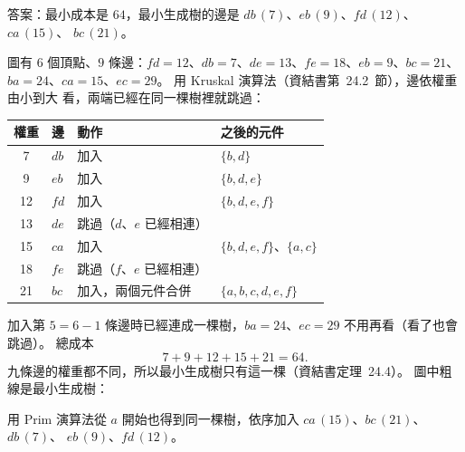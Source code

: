 \begin{pastsoln}
答案：最小成本是 $64$，最小生成樹的邊是 $db\,(7)$、$eb\,(9)$、$fd\,(12)$、$ca\,(15)$、
$bc\,(21)$。

圖有 $6$ 個頂點、$9$ 條邊：$fd = 12$、$db = 7$、$de = 13$、$fe = 18$、$eb = 9$、$bc = 21$、
$ba = 24$、$ca = 15$、$ec = 29$。 用 Kruskal 演算法（資結書第~24.2~節），邊依權重由小到大
看，兩端已經在同一棵樹裡就跳過：
\begin{center}
\begin{tabular}{clll}
\toprule
權重 & 邊 & 動作 & 之後的元件 \\
\midrule
7 & $db$ & 加入 & $\{b, d\}$ \\
9 & $eb$ & 加入 & $\{b, d, e\}$ \\
12 & $fd$ & 加入 & $\{b, d, e, f\}$ \\
13 & $de$ & 跳過（$d$、$e$ 已經相連） & \\
15 & $ca$ & 加入 & $\{b, d, e, f\}$、$\{a, c\}$ \\
18 & $fe$ & 跳過（$f$、$e$ 已經相連） & \\
21 & $bc$ & 加入，兩個元件合併 & $\{a, b, c, d, e, f\}$ \\
\bottomrule
\end{tabular}
\end{center}
加入第 $5 = 6 - 1$ 條邊時已經連成一棵樹，$ba = 24$、$ec = 29$ 不用再看（看了也會跳過）。
總成本
\[
7 + 9 + 12 + 15 + 21 = 64.
\]
九條邊的權重都不同，所以最小生成樹只有這一棵（資結書定理~24.4）。 圖中粗線是最小生成樹：

\begin{center}
\end{center}

用 Prim 演算法從 $a$ 開始也得到同一棵樹，依序加入 $ca\,(15)$、$bc\,(21)$、$db\,(7)$、
$eb\,(9)$、$fd\,(12)$。
\end{pastsoln}
